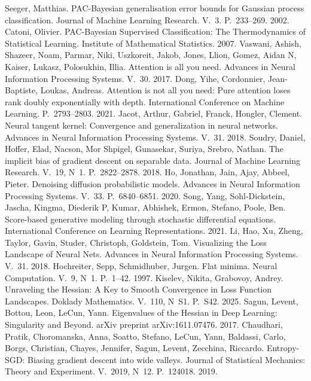  Seeger, Matthias. PAC-Bayesian generalisation error bounds for Gaussian process classification. Journal of Machine Learning Research. V.~3. P.~233--269. 2002.
 Catoni, Olivier. PAC-Bayesian Supervised Classification: The Thermodynamics of Statistical Learning. Institute of Mathematical Statistics. 2007.
 Vaswani, Ashish, Shazeer, Noam, Parmar, Niki, Uszkoreit, Jakob, Jones, Llion, Gomez, Aidan N, Kaiser, Lukasz, Polosukhin, Illia. Attention is all you need. Advances in Neural Information Processing Systems. V.~30. 2017.
 Dong, Yihe, Cordonnier, Jean-Baptiste, Loukas, Andreas. Attention is not all you need: Pure attention loses rank doubly exponentially with depth. International Conference on Machine Learning. P.~2793--2803. 2021.
 Jacot, Arthur, Gabriel, Franck, Hongler, Clement. Neural tangent kernel: Convergence and generalization in neural networks. Advances in Neural Information Processing Systems. V.~31. 2018.
 Soudry, Daniel, Hoffer, Elad, Nacson, Mor Shpigel, Gunasekar, Suriya, Srebro, Nathan. The implicit bias of gradient descent on separable data. Journal of Machine Learning Research. V.~19, N~1. P.~2822--2878. 2018.
 Ho, Jonathan, Jain, Ajay, Abbeel, Pieter. Denoising diffusion probabilistic models. Advances in Neural Information Processing Systems. V.~33. P.~6840--6851. 2020.
 Song, Yang, Sohl-Dickstein, Jascha, Kingma, Diederik P, Kumar, Abhishek, Ermon, Stefano, Poole, Ben. Score-based generative modeling through stochastic differential equations. International Conference on Learning Representations. 2021.
 Li, Hao, Xu, Zheng, Taylor, Gavin, Studer, Christoph, Goldstein, Tom. Visualizing the Loss Landscape of Neural Nets. Advances in Neural Information Processing Systems. V.~31. 2018.
 Hochreiter, Sepp, Schmidhuber, Jurgen. Flat minima. Neural Computation. V.~9, N~1. P.~1--42. 1997.
 Kiselev, Nikita, Grabovoy, Andrey. Unraveling the Hessian: A Key to Smooth Convergence in Loss Function Landscapes. Doklady Mathematics. V.~110, N~S1. P.~S42. 2025.
 Sagun, Levent, Bottou, Leon, LeCun, Yann. Eigenvalues of the Hessian in Deep Learning: Singularity and Beyond. arXiv preprint arXiv:1611.07476. 2017.
 Chaudhari, Pratik, Choromanska, Anna, Soatto, Stefano, LeCun, Yann, Baldassi, Carlo, Borgs, Christian, Chayes, Jennifer, Sagun, Levent, Zecchina, Riccardo. Entropy-SGD: Biasing gradient descent into wide valleys. Journal of Statistical Mechanics: Theory and Experiment. V.~2019, N~12. P.~124018. 2019.
